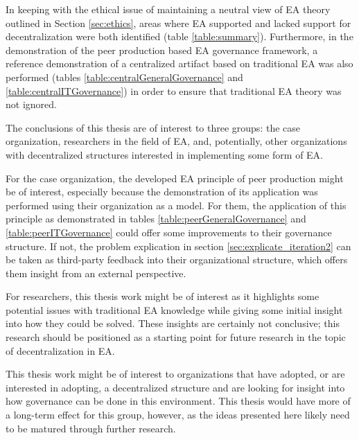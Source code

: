 In keeping with the ethical issue of maintaining a neutral view of EA theory outlined in Section \ref{sec:ethics}, areas where EA supported and lacked support for decentralization were both identified (table \ref{table:summary}). Furthermore, in the demonstration of the peer production based EA governance framework, a reference demonstration of a centralized artifact based on traditional EA was also performed (tables \ref{table:centralGeneralGovernance} and \ref{table:centralITGovernance}) in order to ensure that traditional EA theory was not ignored. 

The conclusions of this thesis are of interest to three groups: the case organization, researchers in the field of EA, and, potentially, other organizations with decentralized structures interested in implementing some form of EA. 

For the case organization, the developed EA principle of peer production might be of interest, especially because the demonstration of its application was performed using their organization as a model. For them, the application of this principle as demonstrated in tables \ref{table:peerGeneralGovernance} and \ref{table:peerITGovernance} could offer some improvements to their governance structure. If not, the problem explication in section \ref{sec:explicate_iteration2} can be taken as third-party feedback into their organizational structure, which offers them insight from an external perspective. 

For researchers, this thesis work might be of interest as it highlights some potential issues with traditional EA knowledge while giving some initial insight into how they could be solved. These insights are certainly not conclusive; this research should be positioned as a starting point for future research in the topic of decentralization in EA. 

This thesis work might be of interest to organizations that have adopted, or are interested in adopting, a decentralized structure and are looking for insight into how governance can be done in this environment. This thesis would have more of a long-term effect for this group, however, as the ideas presented here likely need to be matured through further research.  

